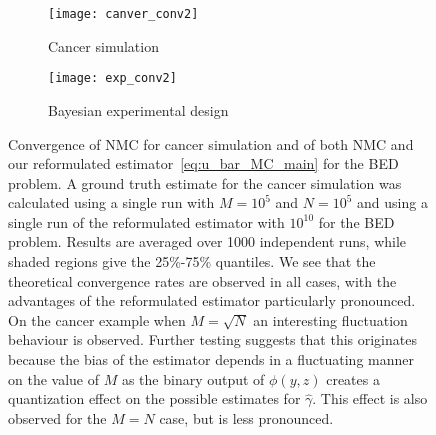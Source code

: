 \begin{figure}[t]
	\centering
	\begin{subfigure}[b]{0.49\textwidth}
		\centering
				\texttt{[image: canver\_conv2]}
	\caption{Cancer simulation\label{fig:emperical-conv-cancer}}
	\end{subfigure}
	\begin{subfigure}[b]{0.49\textwidth}
		\centering
			\texttt{[image: exp\_conv2]}
		\caption{Bayesian experimental design\label{fig:exp-conv}}
	\end{subfigure}
	\caption{Convergence of NMC for cancer simulation and of both NMC and our reformulated
		estimator~\eqref{eq:u_bar_MC_main} for the BED problem.
		A ground truth estimate for the cancer simulation was calculated
		using a single run with $M=10^5$ and $N=10^5$ and using a single run of the reformulated
		estimator with $10^{10}$ for the BED problem.
		Results are averaged over 1000 independent runs, while shaded regions give the 25\%-75\% quantiles. We
		see that the theoretical convergence rates are observed in all cases,
		with the advantages of the reformulated estimator particularly pronounced.
		On the cancer example when $M=\sqrt{N}$ an interesting fluctuation behaviour is observed.  
		Further testing suggests that this originates because the bias of the estimator depends in
		a fluctuating manner on the value of $M$ as the binary output of $\phi(y,z)$ creates a quantization
		effect on the possible estimates for $\hat{\gamma}$.  This effect is also observed for the $M=N$ case,
		but is less pronounced. \vspace{-5pt}}
\end{figure}
